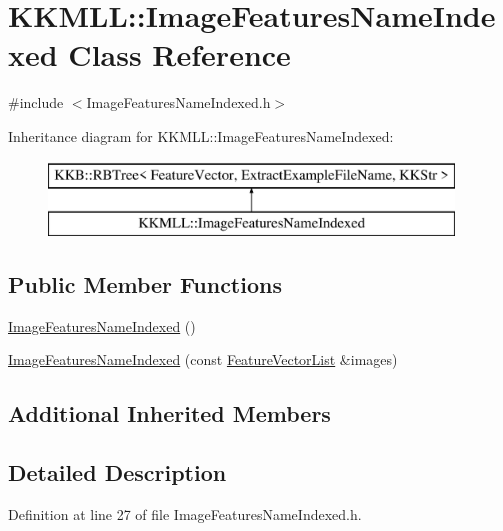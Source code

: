 \hypertarget{class_k_k_m_l_l_1_1_image_features_name_indexed}{}\section{K\+K\+M\+LL\+:\+:Image\+Features\+Name\+Indexed Class Reference}
\label{class_k_k_m_l_l_1_1_image_features_name_indexed}


{\ttfamily \#include $<$Image\+Features\+Name\+Indexed.\+h$>$}

Inheritance diagram for K\+K\+M\+LL\+:\+:Image\+Features\+Name\+Indexed\+:\begin{figure}[H]
\begin{center}
\leavevmode
\includegraphics[height=2.000000cm]{class_k_k_m_l_l_1_1_image_features_name_indexed}
\end{center}
\end{figure}
\subsection*{Public Member Functions}
\begin{DoxyCompactItemize}
\item 
\hyperlink{class_k_k_m_l_l_1_1_image_features_name_indexed_a4ffb27619deb6e2bed93606f12b7fa80}{Image\+Features\+Name\+Indexed} ()
\item 
\hyperlink{class_k_k_m_l_l_1_1_image_features_name_indexed_a39d8364fde96e5b1ebf3013eb1649ce5}{Image\+Features\+Name\+Indexed} (const \hyperlink{class_k_k_m_l_l_1_1_feature_vector_list}{Feature\+Vector\+List} \&images)
\end{DoxyCompactItemize}
\subsection*{Additional Inherited Members}


\subsection{Detailed Description}


Definition at line 27 of file Image\+Features\+Name\+Indexed.\+h.



